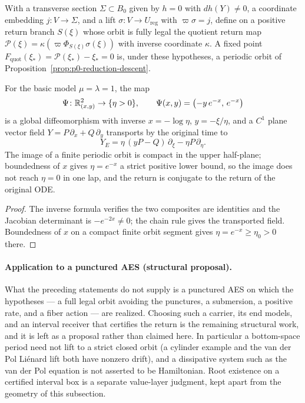 \begin{corollary}
\label{cor:p0-reduction-section}
With a transverse section $\Sigma\subset B_0$ given by $h=0$ with
$dh(Y)\neq0$, a coordinate embedding $j\colon V\to\Sigma$, and a lift
$\sigma\colon V\to U_{\mathrm{reg}}$ with $\varpi\sigma=j$, define on a positive
return branch $S(\xi)$ whose orbit is fully legal the quotient return map
$\mathcal P(\xi)=\kappa(\varpi\Phi_{S(\xi)}\sigma(\xi))$ with inverse coordinate
$\kappa$.  A fixed point $F_{\mathrm{quot}}(\xi_*)=\mathcal P(\xi_*)-\xi_*=0$ is,
under these hypotheses, a periodic orbit of
Proposition~\ref{prop:p0-reduction-descent}.
\end{corollary}

\begin{proposition}
\label{prop:p0-reduction-transport}
For the basic model $\mu=\lambda=1$, the map
\[
  \Psi\colon\mathbb{R}^2_{(x,y)}\to\{\eta>0\},
  \qquad
  \Psi(x,y)=\bigl(-y\,e^{-x},\,e^{-x}\bigr)
\]
is a global diffeomorphism with inverse $x=-\log\eta$, $y=-\xi/\eta$, and a $C^1$
plane vector field $Y=P\,\partial_x+Q\,\partial_y$ transports by the original
time to
\[
  Y_E=\eta\,(yP-Q)\,\partial_\xi-\eta P\,\partial_\eta .
\]
The image of a finite periodic orbit is compact in the upper half-plane;
boundedness of $x$ gives $\eta=e^{-x}$ a strict positive lower bound, so the image
does not reach $\eta=0$ in one lap, and the return is conjugate to the return of
the original ODE.
\end{proposition}

\begin{proof}
The inverse formula verifies the two composites are identities and the Jacobian
determinant is $-e^{-2x}\neq0$; the chain rule gives the transported field.
Boundedness of $x$ on a compact finite orbit segment gives
$\eta=e^{-x}\ge\eta_0>0$ there.
\end{proof}

\paragraph{Application to a punctured AES (structural proposal).}  What the
preceding statements do not supply is a punctured AES on which the hypotheses --- a
full legal orbit avoiding the punctures, a submersion, a positive rate, and a
fiber action --- are realized.  Choosing such a carrier, its end models, and an
interval receiver that certifies the return is the remaining structural work, and
it is left as a proposal rather than claimed here.  In particular a bottom-space
period need not lift to a strict closed orbit (a cylinder example and the van der
Pol Li\'enard lift both have nonzero drift), and a dissipative system such as the
van der Pol equation is not asserted to be Hamiltonian.  Root existence on a
certified interval box is a separate value-layer judgment, kept apart from the
geometry of this subsection.

